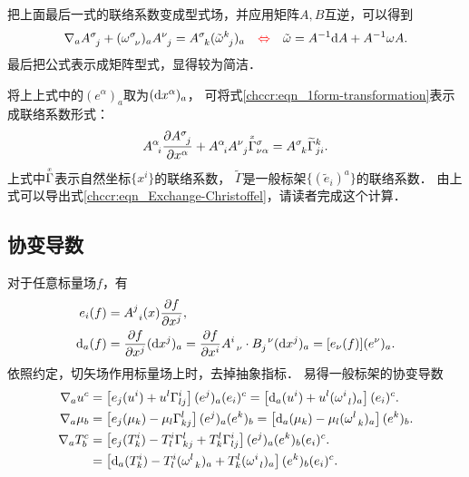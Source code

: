 把上面最后一式的联络系数变成型式场，并应用矩阵$A,B$互逆，可以得到
\begin{equation}\label{chccr:eqn_1form-transformation}
    \nabla _a A_{\hphantom{a} j}^{\sigma} + (\omega ^{\sigma}_{\hphantom{a}\nu})_a  A_{\hphantom{a} j}^{\nu}
    =  A_{\hphantom{a} k}^{\sigma} (\tilde{\omega} _{\hphantom{a} j} ^{k})_a
     {\quad \color{red}\Leftrightarrow \quad }
    \tilde{\omega} = A^{-1}{\rm d} A + A^{-1} \omega A.
\end{equation}
最后把公式表示成矩阵型式，显得较为简洁．


将上上式中的$(e^\alpha)_{a}$取为$({\rm d}x^\alpha)_a$，
可将式\eqref{chccr:eqn_1form-transformation}表示成联络系数形式：
\begin{equation}\label{chccr:eqn_GAMMA-trans}
    A_{\hphantom{a} i}^{\alpha}\frac{\partial A_{\hphantom{a} j}^{\sigma} }{\partial x^\alpha}  
    + A_{\hphantom{a} i}^{\alpha} A_{\hphantom{a} j}^{\nu}\oversetmy{x}{\Gamma}^{\sigma}_{\nu \alpha} 
    =  A_{\hphantom{a} k}^{\sigma} \widetilde{\Gamma}^{k}_{j i}  .
\end{equation}
上式中$\oversetmy{x}{\Gamma}$表示自然坐标$\{x^i\}$的联络系数，
$\widetilde{\Gamma}$是一般标架$\{(\tilde{e}_i)^a\}$的联络系数．
由上式可以导出式\eqref{chccr:eqn_Exchange-Christoffel}，请读者完成这个计算．

\subsection{协变导数}\label{chccr:sec_CovD-Form}
对于任意标量场$f$，有
\begin{align}
    {e} _i (f)&= A_{\hphantom{a} i}^{j}(x) \frac{\partial f}{\partial x^j}, \\
    {\rm d}_a (f) &=  \frac{\partial f}{\partial x^j} ({\rm d} x^j)_a
    = \frac{\partial f}{\partial x^i}  A_{\hphantom{a} \nu}^{i}\cdot
    B^{\hphantom{a} \nu}_{j} ({\rm d} x^j)_a
    = [{e} _\nu (f)] (e^\nu)_a .
\end{align}
依照约定，切矢场作用标量场上时，去掉抽象指标．
易得一般标架的协变导数
\begin{align}
    \nabla_a u^c &= \left[e_j (u^i) + u^l \Gamma^{i}_{lj} \right] (e^j)_a (e_i)^c
    =  \left[{\rm d}_a (u^i) + u^l (\omega_{\hphantom{a} l}^{i})_a \right] (e_i)^c .   \\
    \nabla_a \mu_b &= \left[e_j (\mu_k)-\mu_l \Gamma^{l}_{kj} \right] (e^j)_a (e^k)_b
    =  \left[{\rm d}_a (\mu_k) -\mu_l (\omega_{\hphantom{a} k}^{l})_a \right] (e^k)_b . \\
    \nabla_a T_b^c & = \left[e_j (T_k^i) -T_l^i \Gamma^{l}_{kj}+ T^l_k \Gamma^{i}_{lj} \right]
          (e^j)_a (e^k)_b (e_i)^c.    \label{chccr:eqn_eTg}  \\
      &= \left[{\rm d}_a (T_k^i) -T_l^i (\omega_{\hphantom{a} k}^{l})_a
         +T^l_k (\omega_{\hphantom{a} l}^{i})_a \right] (e^k)_b (e_i)^c  .  \label{chccr:eqn_eTw}
\end{align}


